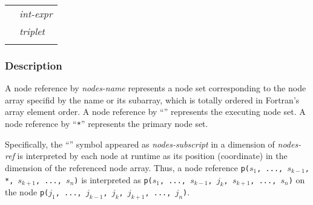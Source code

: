 \hspace{\hsize}

\begin{tabular}{ll}
 \hspace{0.5cm} & {\it int-expr} \\
 \hspace{0.5cm} & {\it triplet} \\
 \hspace{0.5cm} & {\tt *} \\
\end{tabular}


\subsubsection*{Description}


A node reference by {\it nodes-name} represents a node set corresponding
to the node array specifid by the name or its subarray, which is
totally ordered in Fortran's array element order.
%
A node reference by ``{\tt *}''
represents the executing node set. A node reference by ``{\tt **}''
represents the primary node set.


Specifically, the ``{\tt *}'' symbol appeared as {\it nodes-subscript}
in a dimension of {\it nodes-ref} is interpreted by each node at runtime
as its position (coordinate) in the dimension of the referenced node
array.
%
Thus, a node reference {\tt p($s_1$, ..., $s_{k-1}$, *, $s_{k+1}$, ...,
$s_n$)} is interpreted as {\tt p($s_1$, ..., $s_{k-1}$, $j_k$,
$s_{k+1}$, ..., $s_n$)} on the node {\tt p($j_1$, ..., $j_{k-1}$, $j_k$,
$j_{k+1}$, ..., $j_n$)}.

